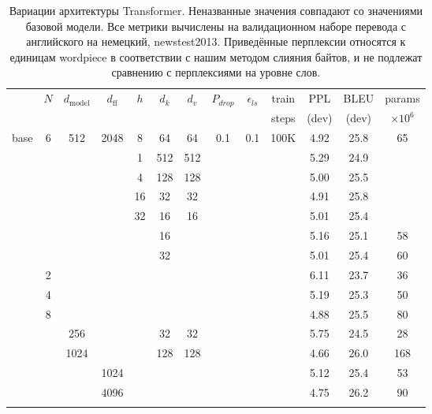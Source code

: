 \documentclass{article}
\newcommand{\dmodel}{d_{\text{model}}}
\newcommand{\dff}{d_{\text{ff}}}
\begin{document}
\begin{table}[t]
\caption{Вариации архитектуры Transformer. Неназванные значения совпадают со значениями базовой модели. Все метрики вычислены на валидационном наборе перевода с английского на немецкий, newstest2013. Приведённые перплексии относятся к единицам wordpiece в соответствии с нашим методом слияния байтов, и не подлежат сравнению с перплексиями на уровне слов.}
\label{tab:variations}
\begin{center}
\vspace{-2mm}
\begin{tabular}{c|ccccccccc|ccc}
\hline\rule{0pt}{2.0ex}
 & \multirow{2}{*}{$N$} & \multirow{2}{*}{$\dmodel$} &
\multirow{2}{*}{$\dff$} & \multirow{2}{*}{$h$} & 
\multirow{2}{*}{$d_k$} & \multirow{2}{*}{$d_v$} & 
\multirow{2}{*}{$P_{drop}$} & \multirow{2}{*}{$\epsilon_{ls}$} &
train & PPL & BLEU & params \\
 & & & & & & & & & steps & (dev) & (dev) & $\times10^6$ \\
\hline\rule{0pt}{2.0ex}
base & 6 & 512 & 2048 & 8 & 64 & 64 & 0.1 & 0.1 & 100K & 4.92 & 25.8 & 65 \\
\hline\rule{0pt}{2.0ex}
\multirow{4}{*}{(A)}
& & & & 1 & 512 & 512 & & & & 5.29 & 24.9 &  \\
& & & & 4 & 128 & 128 & & & & 5.00 & 25.5 &  \\
& & & & 16 & 32 & 32 & & & & 4.91 & 25.8 &  \\
& & & & 32 & 16 & 16 & & & & 5.01 & 25.4 &  \\
\hline\rule{0pt}{2.0ex}
\multirow{2}{*}{(B)}
& & & & & 16 & & & & & 5.16 & 25.1 & 58 \\
& & & & & 32 & & & & & 5.01 & 25.4 & 60 \\
\hline\rule{0pt}{2.0ex}
\multirow{7}{*}{(C)}
& 2 & & & & & & & &            & 6.11 & 23.7 & 36 \\
& 4 & & & & & & & &            & 5.19 & 25.3 & 50 \\
& 8 & & & & & & & &            & 4.88 & 25.5 & 80 \\
& & 256 & & & 32 & 32 & & &    & 5.75 & 24.5 & 28 \\
& & 1024 & & & 128 & 128 & & & & 4.66 & 26.0 & 168 \\
& & & 1024 & & & & & &         & 5.12 & 25.4 & 53 \\
& & & 4096 & & & & & &         & 4.75 & 26.2 & 90 \\
\hline\rule{0pt}{2.0ex}
\multirow{4}{*}{(D)}

\end{tabular}
\end{center}
\end{table}
\end{document}
